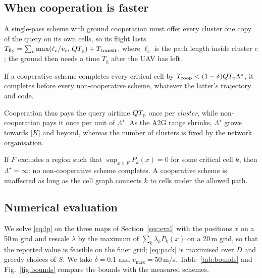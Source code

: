 \subsection{When cooperation is faster}
A single-pass scheme with ground cooperation must offer every cluster one copy of the query on its own cells, so its
flight lasts $T_{\mathrm{fly}}=\sum_c\max(\ell_c/v_c,\,QT_{\mathrm p})+T_{\mathrm{transit}}$, where $\ell_c$ is the path length
inside cluster $c$; the ground then needs a time $T_{\mathrm g}$ after the UAV has left.
\begin{corollary}\label{cor:cross}
If a cooperative scheme completes every critical cell by
$T_{\mathrm{coop}}<(1-\delta)QT_{\mathrm p}\Lambda^\star$, it completes before every non-cooperative scheme, whatever the latter's
trajectory and code.
\end{corollary}
Cooperation thus pays the query airtime $QT_{\mathrm p}$ once per \emph{cluster}, while non-cooperation pays it once per unit of
$\Lambda^\star$. As the A2G range shrinks, $\Lambda^\star$ grows towards $|K|$ and beyond, whereas the number of clusters
is fixed by the network organisation.

\begin{corollary}\label{cor:nofly}
If $F$ excludes a region such that $\sup_{x\in F}P_k(x)=0$ for some critical cell $k$, then $\Lambda^\star=\infty$: no
non-cooperative scheme completes. A cooperative scheme is unaffected as long as the cell graph connects $k$ to cells
under the allowed path.
\end{corollary}

\subsection{Numerical evaluation}
We solve \eqref{eq:lp} on the three maps of Section~\ref{sec:eval} with the positions $x$ on a 50\,m grid and rescale
$\lambda$ by the maximum of $\sum_k\lambda_kP_k(x)$ on a 20\,m grid, so that the reported value is feasible on the finer
grid; \eqref{eq:pack} is maximised over $D$ and greedy choices of $S$. We take $\delta=0.1$ and $v_{\max}=50$\,m/s.
Table~\ref{tab:bounds} and Fig.~\ref{fig:bounds} compare the bounds with the measured schemes.

